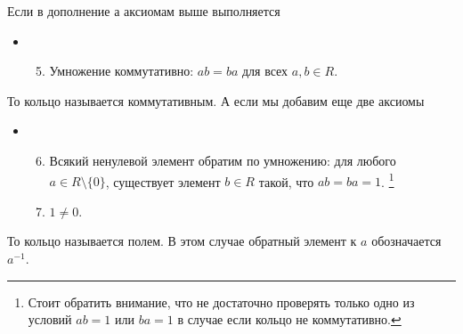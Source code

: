 \begin{definition}
Если в дополнение а аксиомам выше выполняется
\begin{itemize}
\item[]
\begin{enumerate}
\setcounter{enumi}{4}
\item Умножение коммутативно: $ab = ba$ для всех $a, b\in R$.
\end{enumerate}
\end{itemize}
То кольцо называется коммутативным.
А если мы добавим еще две аксиомы
\begin{itemize}
\item[]
\begin{enumerate}
\setcounter{enumi}{5}
\item Всякий ненулевой элемент обратим по умножению: для любого $a\in R\setminus\{0\}$, существует элемент $b\in R$ такой, что $ab = ba = 1$.%
\footnote{Стоит обратить внимание, что не достаточно проверять только одно из условий $ab = 1$ или $ba = 1$ в случае если кольцо не коммутативно.}

\item $1 \neq 0$.
\end{enumerate}
\end{itemize}
То кольцо называется полем.
В этом случае обратный элемент к $a$ обозначается  $a^{-1}$.
\end{definition}

